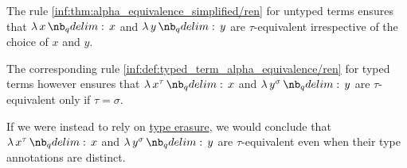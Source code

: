 \begin{example}\label{ex:def:typed_term_alpha_equivalence}
  The rule \ref{inf:thm:alpha_equivalence_simplified/ren} for untyped terms ensures that \( \qabs x x \) and \( \qabs y y \) are \( \tau \)-equivalent irrespective of the choice of \( x \) and \( y \).

  The corresponding rule \ref{inf:def:typed_term_alpha_equivalence/ren} for typed terms however ensures that \( \qabs {x^\tau} x \) and \( \qabs {y^\sigma} y \) are \( \tau \)-equivalent only if \( \tau = \sigma \).

  If we were instead to rely on \hyperref[alg:type_erasure]{type erasure}, we would conclude that \( \qabs {x^\tau} x \) and \( \qabs {y^\sigma} y \) are \( \tau \)-equivalent even when their type annotations are distinct.
\end{example}

\begin{proposition}\label{thm:alpha_equivalent_term_typing}
\end{proposition}

\begin{definition}\label{def:lambda_term_strong_normalization}
\end{definition}

